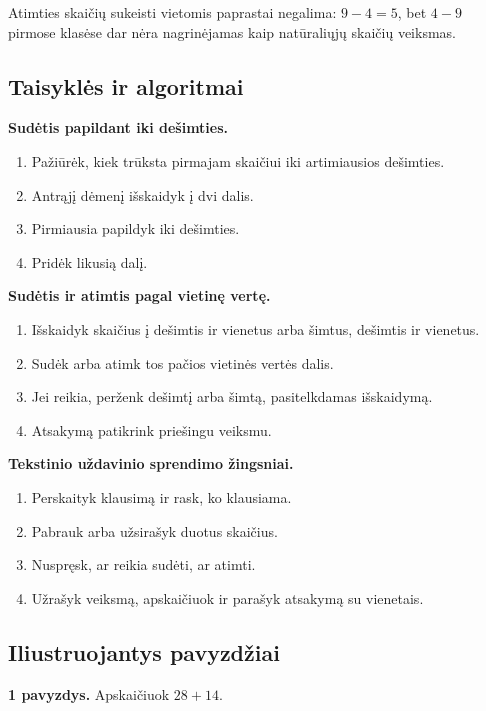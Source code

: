 \begin{pastaba}
Atimties skaičių sukeisti vietomis paprastai negalima: \(9-4=5\), bet \(4-9\) pirmose klasėse dar nėra nagrinėjamas kaip natūraliųjų skaičių veiksmas.
\end{pastaba}

\subsection{Taisyklės ir algoritmai}

\textbf{Sudėtis papildant iki dešimties.}
\begin{enumerate}
\item Pažiūrėk, kiek trūksta pirmajam skaičiui iki artimiausios dešimties.
\item Antrąjį dėmenį išskaidyk į dvi dalis.
\item Pirmiausia papildyk iki dešimties.
\item Pridėk likusią dalį.
\end{enumerate}

\textbf{Sudėtis ir atimtis pagal vietinę vertę.}
\begin{enumerate}
\item Išskaidyk skaičius į dešimtis ir vienetus arba šimtus, dešimtis ir vienetus.
\item Sudėk arba atimk tos pačios vietinės vertės dalis.
\item Jei reikia, perženk dešimtį arba šimtą, pasitelkdamas išskaidymą.
\item Atsakymą patikrink priešingu veiksmu.
\end{enumerate}

\textbf{Tekstinio uždavinio sprendimo žingsniai.}
\begin{enumerate}
\item Perskaityk klausimą ir rask, ko klausiama.
\item Pabrauk arba užsirašyk duotus skaičius.
\item Nuspręsk, ar reikia sudėti, ar atimti.
\item Užrašyk veiksmą, apskaičiuok ir parašyk atsakymą su vienetais.
\end{enumerate}

\subsection{Iliustruojantys pavyzdžiai}

\textbf{1 pavyzdys.} Apskaičiuok \(28+14\).


